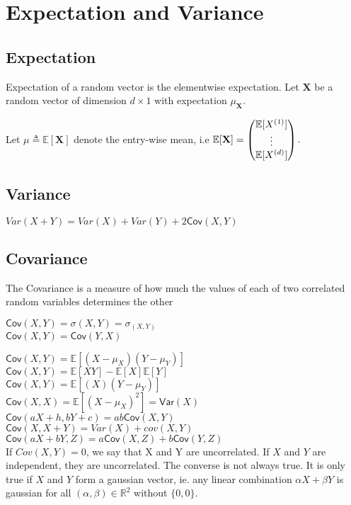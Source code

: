 \section{Expectation and Variance}
\subsection*{Expectation}

Expectation of a random vector is the elementwise expectation. Let $\mathbf X$  be a random vector of dimension $d \times 1$ with expectation $\mu _{\mathbf X}$. 

Let $\mu \triangleq \mathbb E[\mathbf X]$  denote the entry-wise mean, i.e $\displaystyle  \displaystyle \mathbb E[\mathbf X] = \displaystyle \begin{pmatrix} \mathbb E[X^{(1)}]\\ \vdots \\ \mathbb E[X^{(d)}]\end{pmatrix}.$

\subsection*{Variance}

$Var(X + Y)=Var(X)+Var(Y)+2\textsf{Cov}(X,Y)$
\subsection*{Covariance}

The Covariance is a measure of how much the values of each of two correlated random variables determines the other

$\textsf{Cov}(X,Y) = \sigma(X,Y) = \sigma_ {(X,Y)}$\\

$\textsf{Cov}(X,Y) = \textsf{Cov}(Y,X)$

$\textsf{Cov}(X,Y) = \mathbb E[(X - \mu _ X)(Y - \mu _ Y)]$ \\

$\textsf{Cov}(X,Y) = \mathbb E[XY] - \mathbb E[X]\mathbb E[Y] $\\

$ \textsf{Cov}(X,Y)= \displaystyle  \mathbb E[(X)(Y-\mu _ Y)]$\\

$\textsf{Cov}(X,X) = \mathbb E[(X - \mu _ X)^2] = \textsf{Var}(X)$\\

$\textsf{Cov}(aX + h,bY + c)= ab\textsf{Cov}(X,Y)$\\

$\textsf{Cov}(X,X + Y)= Var(X) + cov(X,Y)$\\

$\displaystyle  \textsf{Cov}(aX+ bY, Z) \displaystyle = a\textsf{Cov}(X,Z) + b\textsf{Cov}(Y,Z)$\\

If $Cov(X,Y) = 0$, we say that X and Y are uncorrelated. If $X$ and $Y$ are independent, they are uncorrelated. The converse is not always true. It is only true if $X$ and $Y$ form a gaussian vector, ie. any linear combination $\alpha X + \beta Y$ is gaussian for all $(\alpha,\beta) \in \mathbb{R}^2$ without $\{0,0\}$.